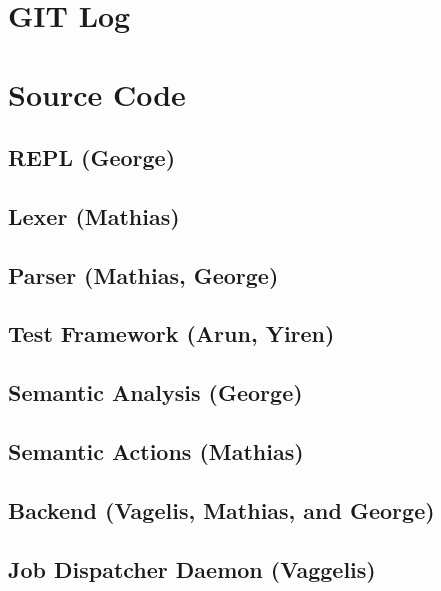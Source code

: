 \linespread{0.5}
\section{GIT Log}
\label{sect:appen}


\section{Source Code}

\subsection{REPL (George)}



\subsection{Lexer (Mathias)}


\subsection{Parser (Mathias, George)}


\subsection{Test Framework (Arun, Yiren)}


\subsection{Semantic Analysis (George)}


\subsection{Semantic Actions (Mathias)}


\subsection{Backend (Vagelis, Mathias, and George)}



\subsection{Job Dispatcher Daemon (Vaggelis)}




